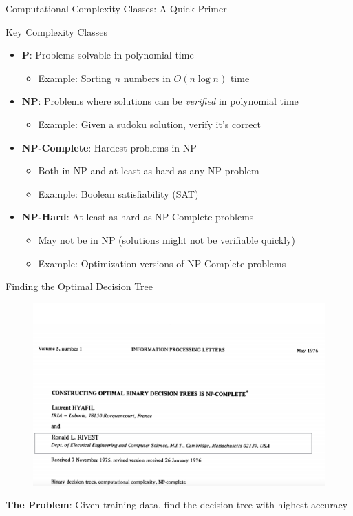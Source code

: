 \documentclass[usenames,dvipsnames]{beamer}
\begin{document}
\begin{frame}{Computational Complexity Classes: A Quick Primer}
\begin{definitionbox}{Key Complexity Classes}
\begin{itemize}
\item \textbf{P}: Problems solvable in polynomial time
\begin{itemize}
\item Example: Sorting $n$ numbers in $O(n \log n)$ time
\end{itemize}
\item \textbf{NP}: Problems where solutions can be \emph{verified} in polynomial time
\begin{itemize}
\item Example: Given a sudoku solution, verify it's correct
\end{itemize}
\item \textbf{NP-Complete}: Hardest problems in NP 
\begin{itemize}
\item Both in NP and at least as hard as any NP problem
\item Example: Boolean satisfiability (SAT)
\end{itemize}
\item \textbf{NP-Hard}: At least as hard as NP-Complete problems
\begin{itemize}
\item May not be in NP (solutions might not be verifiable quickly)
\item Example: Optimization versions of NP-Complete problems
\end{itemize}
\end{itemize}
\end{definitionbox}
\end{frame}




\begin{frame}{Finding the Optimal Decision Tree}
\begin{center}
\begin{figure}
	\centering
	\includegraphics[width=0.8\linewidth]{../assets/decision-trees/diagrams/NP-hard}
	\label{fig:np-hard}
\end{figure}
\end{center}
\textbf{The Problem}: Given training data, find the decision tree with highest accuracy
\end{frame}
\end{document}
